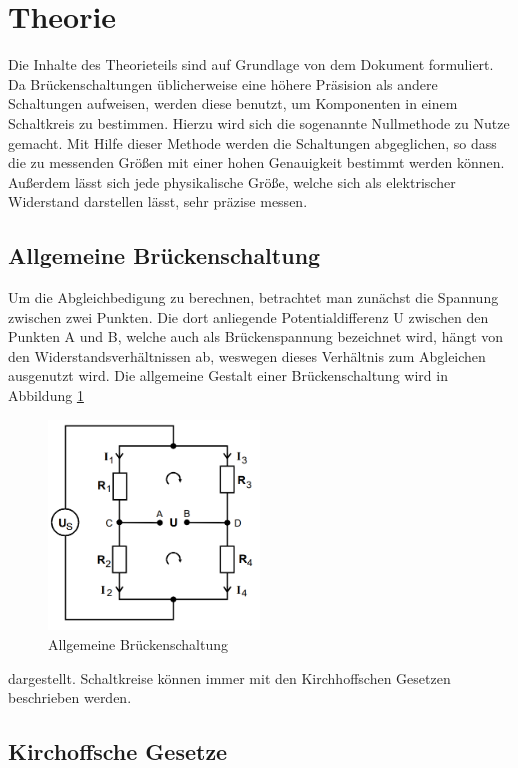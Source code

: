 \section{Theorie}
\label{sec:Theorie}
Die Inhalte des Theorieteils sind auf Grundlage von dem Dokument \cite{anleitung} formuliert.
Da Brückenschaltungen üblicherweise eine höhere Präsision als andere Schaltungen aufweisen, werden diese benutzt, um Komponenten in einem Schaltkreis zu bestimmen. 
Hierzu wird sich die sogenannte Nullmethode zu Nutze gemacht. 
Mit Hilfe dieser Methode werden die Schaltungen abgeglichen, so dass die zu messenden Größen mit einer hohen Genauigkeit bestimmt werden können. 
Außerdem lässt sich jede physikalische Größe, welche sich als elektrischer Widerstand darstellen lässt, sehr präzise messen.
\subsection{Allgemeine Brückenschaltung}
Um die Abgleichbedigung zu berechnen, betrachtet man zunächst die Spannung zwischen zwei Punkten. Die dort anliegende Potentialdifferenz U
zwischen den Punkten A und B, welche auch als Brückenspannung bezeichnet wird, hängt von den Widerstandsverhältnissen ab,
weswegen dieses Verhältnis zum Abgleichen ausgenutzt wird.
Die allgemeine Gestalt einer Brückenschaltung wird in  Abbildung \ref{fig:allgBrücke}
\begin{figure}
    \centering
    \caption{Allgemeine Brückenschaltung} 
    \label{fig:allgBrücke}
    \includegraphics[width = 0.5\textwidth]{bridges/genbridge.png}
\end{figure}
dargestellt. Schaltkreise können immer mit den Kirchhoffschen Gesetzen beschrieben werden.
\subsection{Kirchoffsche Gesetze}
